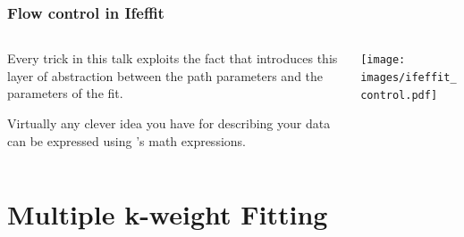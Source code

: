 \documentclass[10pt, xcolor=x11names, compress]{beamer}
\begin{document}
\begin{frame}
  \frametitle{Flow control in Ifeffit}

  \begin{columns}
    \begin{column}{0.5\linewidth}
      Every trick in this talk exploits the fact that {\ifeffit}
      introduces this layer of abstraction between the
      {\color{SlateBlue3}path parameters} and the
      {\color{Green4}parameters of the fit}.

      \bigskip

      \begin{exampleblock}{}
        Virtually any clever idea you have for describing your data
        can be expressed using {\ifeffit}'s math expressions.
      \end{exampleblock}
    \end{column}
    \begin{column}{0.5\linewidth}
      \texttt{[image: images/ifeffit\_control.pdf]}      
    \end{column}
  \end{columns}
\end{frame}

\section[MKW]{Multiple k-weight Fitting}
\end{document}
